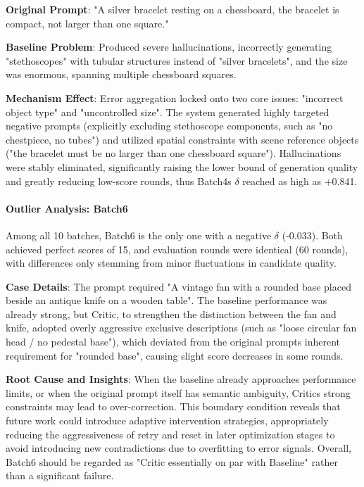 \documentclass[UTF8]{article} %
\begin{document}
\textbf{Original Prompt}: "A silver bracelet resting on a chessboard,
the bracelet is compact, not larger than one square."

\textbf{Baseline Problem}: Produced severe hallucinations, incorrectly
generating "stethoscopes" with tubular structures instead of "silver
bracelets", and the size was enormous, spanning multiple chessboard
squares.

\textbf{Mechanism Effect}: Error aggregation locked onto two core
issues: "incorrect object type" and "uncontrolled size". The system
generated highly targeted negative prompts (explicitly excluding
stethoscope components, such as "no chestpiece, no tubes") and utilized
spatial constraints with scene reference objects ("the bracelet must be
no larger than one chessboard square"). Hallucinations were stably
eliminated, significantly raising the lower bound of generation quality
and greatly reducing low-score rounds, thus Batch4\textquotesingle s $ \delta $
reached as high as +0.841.

\paragraph{Outlier Analysis: Batch6}\label{outlier-analysis-batch6}

Among all 10 batches, Batch6 is the only one with a negative $ \delta $ (-0.033).
Both achieved perfect scores of 15, and evaluation rounds were identical
(60 rounds), with differences only stemming from minor fluctuations in
candidate quality.

\textbf{Case Details}: The prompt required "A vintage fan with a rounded
base placed beside an antique knife on a wooden table". The baseline
performance was already strong, but Critic, to strengthen the
distinction between the fan and knife, adopted overly aggressive
exclusive descriptions (such as "loose circular fan head / no pedestal
base"), which deviated from the original prompt\textquotesingle s
inherent requirement for "rounded base", causing slight score decreases
in some rounds.

\textbf{Root Cause and Insights}: When the baseline already approaches
performance limits, or when the original prompt itself has semantic
ambiguity, Critic\textquotesingle s strong constraints may lead to
over-correction. This boundary condition reveals that future work could
introduce adaptive intervention strategies, appropriately reducing the
aggressiveness of retry and reset in later optimization stages to avoid
introducing new contradictions due to overfitting to error signals.
Overall, Batch6 should be regarded as "Critic essentially on par with
Baseline" rather than a significant failure.
\end{document}
